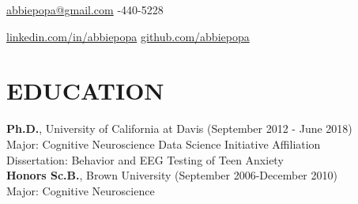 \documentclass[line,margin,10pt]{res}
\begin{document}
 
\begin{resume}
\hoffset\centerline 
{\hyperref[abbiepopa@gmail.com]{abbiepopa@gmail.com} \quad \quad \quad \quad  \quad \quad \quad \quad \quad \quad \quad \quad \quad \quad \quad \quad \quad \quad \quad \quad \quad\quad \quad \quad \quad \quad \quad \quad \quad \quad \quad \quad  \quad \quad {}-440-5228}
\hoffset\centerline 
{\hspace{0.05cm} \hyperref[linkedin.com/in/abbiepopa]{linkedin.com/in/abbiepopa} \quad \quad \quad \quad \quad \quad \quad \quad \quad \quad \quad\quad \quad \quad \quad \quad \quad \quad \quad \quad \quad \quad  \quad \quad \quad  \quad \quad \quad   \quad \hyperref[github.com/abbiepopa]{github.com/abbiepopa}}
 
\section{EDUCATION} 
\textbf{Ph.D.}, University of California at Davis \hfill (September 2012 - June 2018)\\
Major: Cognitive Neuroscience \hfill
Data Science Initiative Affiliation\\
Dissertation: Behavior and EEG Testing of Teen Anxiety \\
\textbf{Honors Sc.B.}, Brown University \hfill (September 2006-December 2010)\\
                Major: Cognitive Neuroscience



\end{resume}
\end{document}
